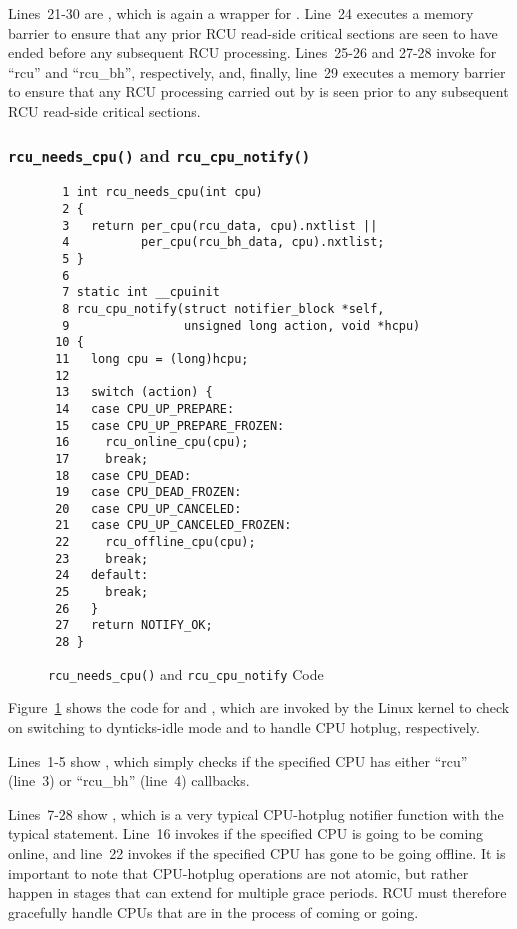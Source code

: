 Lines~21-30 are , which is again a
wrapper for .
Line~24 executes a memory barrier to ensure that any prior RCU
read-side critical sections are seen to have ended before any
subsequent RCU processing.
Lines~25-26 and 27-28 invoke  for
``rcu'' and ``rcu\_bh'', respectively, and, finally,
line~29 executes a memory barrier to ensure that any RCU
processing carried out by 
is seen prior to any subsequent RCU read-side critical sections.

\subsubsection{{\tt rcu\_needs\_cpu()} and {\tt rcu\_cpu\_notify()}}
\label{app:rcuimpl:rcutreewt:rcu-needs-cpu and rcu-cpu-notify}

\begin{figure}[tbp]
{ \scriptsize
\begin{verbatim}
  1 int rcu_needs_cpu(int cpu)
  2 {
  3   return per_cpu(rcu_data, cpu).nxtlist ||
  4          per_cpu(rcu_bh_data, cpu).nxtlist;
  5 }
  6
  7 static int __cpuinit
  8 rcu_cpu_notify(struct notifier_block *self,
  9                unsigned long action, void *hcpu)
 10 {
 11   long cpu = (long)hcpu;
 12
 13   switch (action) {
 14   case CPU_UP_PREPARE:
 15   case CPU_UP_PREPARE_FROZEN:
 16     rcu_online_cpu(cpu);
 17     break;
 18   case CPU_DEAD:
 19   case CPU_DEAD_FROZEN:
 20   case CPU_UP_CANCELED:
 21   case CPU_UP_CANCELED_FROZEN:
 22     rcu_offline_cpu(cpu);
 23     break;
 24   default:
 25     break;
 26   }
 27   return NOTIFY_OK;
 28 }
\end{verbatim}
}
\caption{{\tt rcu\_needs\_cpu()} and {\tt rcu\_cpu\_notify}  Code}
\label{fig:app:rcuimpl:rcutreewt:Code for rcu-needs-cpu and rcu-cpu-notify}
\end{figure}

Figure~\ref{fig:app:rcuimpl:rcutreewt:Code for rcu-needs-cpu and rcu-cpu-notify}
shows the code for  and ,
which are invoked by the Linux kernel to check on switching to
dynticks-idle mode and to handle CPU hotplug, respectively.

Lines~1-5 show , which simply checks if the specified
CPU has either ``rcu'' (line~3) or ``rcu\_bh'' (line~4) callbacks.

Lines~7-28 show , which is a very typical
CPU-hotplug notifier function with the typical  statement.
Line~16 invokes  if the specified CPU is going
to be coming online, and line~22 invokes  if
the specified CPU has gone to be going offline.
It is important to note that CPU-hotplug operations are not atomic,
but rather happen in stages that can extend for multiple grace periods.
RCU must therefore gracefully handle CPUs that are in the process
of coming or going.

